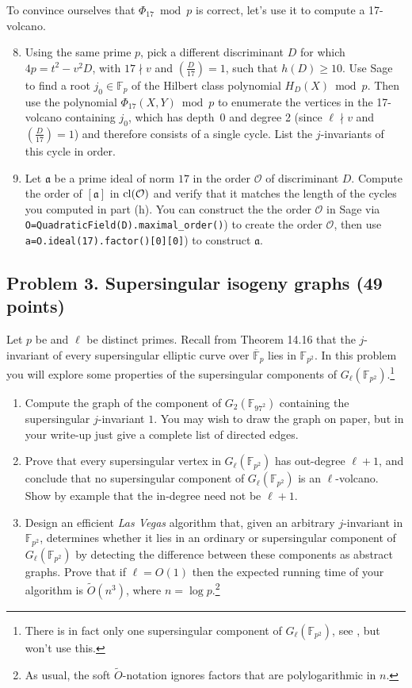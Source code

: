 \documentclass[11pt]{article}
\newcommand{\Fp}{\mathbb{F}_p}
\newcommand{\Fptwo}{\mathbb{F}_{p^2}}
\newcommand{\Fpbar}{\overline{\mathbb{F}}_p}
\newcommand{\F}{\mathbb{F}}
\renewcommand{\O}{\mathcal{O}}
\newcommand{\cl}{{\rm cl}}
\renewcommand{\a}{\mathfrak{a}}
\theoremstyle{definition}
\begin{document}
To convince ourselves that $\Phi_{17}\bmod p$ is correct, let's use it to compute a 17-volcano.

\begin{enumerate}[{\bf (a)}]
\setcounter{enumi}{7}
\item
Using the same prime $p$, pick a different discriminant $D$ for which $4p=t^2-v^2D$, with $17\nmid v$ and $(\frac{D}{17})=1$, such that $h(D)\ge 10$.
Use Sage to find a root $j_0\in\Fp$ of the Hilbert class polynomial $H_{D}(X)\bmod p$.
Then use the polynomial $\Phi_{17}(X,Y)\bmod p$ to enumerate the vertices in the 17-volcano containing $j_0$, which has depth~0 and degree 2 (since $\ell\nmid v$ and $\left(\frac{D}{17}\right)=1$) and therefore consists of a single cycle.  List the $j$-invariants of this cycle in order.
\item Let $\a$ be a prime ideal of norm $17$ in the order $\O$ of discriminant $D$.  Compute the order of $[\a]$ in $\cl(\O)$ and verify that it matches the length of the cycles you computed in part (h).  You can construct the the order $\O$ in Sage via \texttt{O=QuadraticField(D).maximal\_order()}) to create the order $\O$, then use \texttt{a=O.ideal(17).factor()[0][0]}) to construct $\a$.
\end{enumerate}


\subsection*{Problem 3. Supersingular isogeny graphs (49 points)}

Let $p$ be and $\ell$ be distinct primes.
Recall from Theorem 14.16 that the $j$-invariant of every supersingular elliptic curve over $\Fpbar$ lies in $\Fptwo$.
In this problem you will explore some properties of the supersingular components of $G_\ell(\Fptwo)$.\footnote{There is in fact only one supersingular component of $G_\ell(\Fptwo)$, see \cite[Cor.\,78]{kohel}, but won't use this.}

\begin{enumerate}[{\bf(a)}]
\item Compute the graph of the component of $G_2(\F_{97^2})$ containing the supersingular $j$-invariant $1$.
You may wish to draw the graph on paper, but in your write-up just give a complete list of directed edges.

\item Prove that every supersingular vertex in $G_\ell(\Fptwo)$ has out-degree $\ell+1$, and conclude that no supersingular component of $G_\ell(\Fptwo)$ is an $\ell$-volcano.
Show by example that the in-degree need not be $\ell+1$.

\item Design an efficient \emph{Las Vegas} algorithm that, given an arbitrary $j$-invariant in $\Fptwo$, determines whether it lies in an ordinary or supersingular component of $G_\ell(\Fptwo)$ by detecting the difference between these components as abstract graphs.  Prove that if $\ell=O(1)$ then the expected running time of your algorithm is $\tilde{O}(n^3)$, where $n=\log p$.\footnote{As usual, the soft $\tilde{O}$-notation ignores factors that are polylogarithmic in $n$.}
\end{enumerate}
\end{document}
